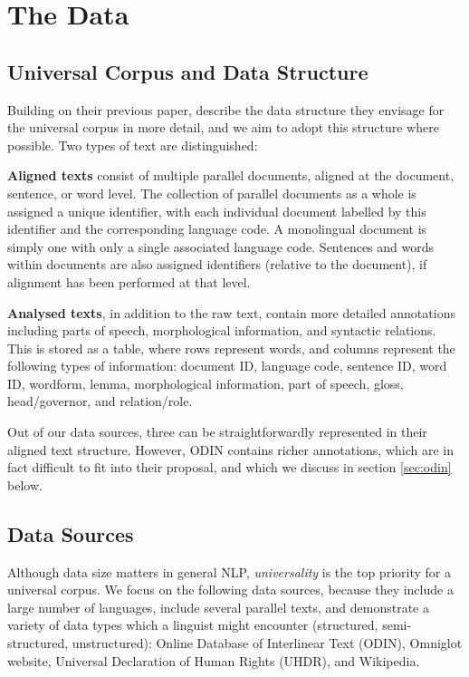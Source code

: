 \section{The Data}\label{sec:data}



\subsection{Universal Corpus and Data Structure} \label{sec:structure}

Building on their previous paper,  describe the data structure they envisage for the universal corpus in more detail, and we aim to adopt this structure where possible.  Two types of text are distinguished:

\textbf{Aligned texts} consist of multiple parallel documents, aligned at the document, sentence, or word level. The collection of parallel documents as a whole is assigned a unique identifier, with each individual document labelled by this identifier and the corresponding language code.  A monolingual document is simply one with only a single associated language code.  Sentences and words within documents are also assigned identifiers (relative to the document), if alignment has been performed at that level.

\textbf{Analysed texts}, in addition to the raw text, contain more detailed annotations including parts of speech, morphological information, and syntactic relations.  This is stored as a table, where rows represent words, and columns represent the following types of information: document ID, language code, sentence ID, word ID, wordform, lemma, morphological information, part of speech, gloss, head/governor, and relation/role.

Out of our data sources, three can be straightforwardly represented in their aligned text structure. However, ODIN contains richer annotations, which are in fact difficult to fit into their proposal, and which we discuss in section \ref{sec:odin} below.


\subsection{Data Sources} \label{sec:sources}

Although data size matters in general NLP, \emph{universality} is the top priority for a universal corpus. We focus on the following data sources, because they include a large number of languages, include several parallel texts, and demonstrate a variety of data types which a linguist might encounter (structured, semi-structured, unstructured): Online Database of Interlinear Text (ODIN), Omniglot website, Universal Declaration of Human Rights (UHDR), and Wikipedia.

